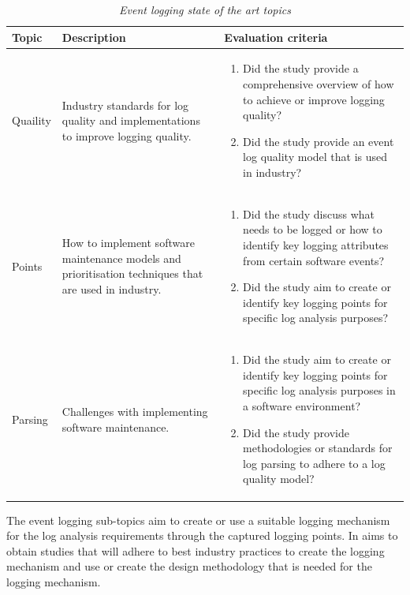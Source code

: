 \begin{table}[!htb]
	\centering
	\caption[Event logging state of the art topics]
	{\textit{Event logging state of the art topics}}
	\label{tbl:ch1_soaEventLogging}
	\begin{tabularx}{\linewidth}{|l|X|X|}
		\hline \textbf{Topic}  & \textbf{Description} & \textbf{Evaluation criteria}\\
		\hline Quaility & \RaggedRight Industry standards for log quality and implementations to improve logging quality.& \RaggedRight \begin{enumerate}
			\item Did the study provide a comprehensive overview of how to achieve or improve logging quality?
			\item Did the study provide an event log quality model that is used in industry?
		\end{enumerate} \\
		\hline Points & \RaggedRight How to implement software maintenance models and prioritisation techniques that are used in industry. & \RaggedRight \begin{enumerate}
			\item Did the study discuss what needs to be logged or how to identify key logging attributes from certain software events?
			\item Did the study aim to create or identify key logging points for specific log analysis purposes?
		\end{enumerate} \\
		\hline Parsing & \RaggedRight Challenges with implementing software maintenance. & \RaggedRight \begin{enumerate}
			\item Did the study aim to create or identify key logging points for specific log analysis purposes in a software environment?
			\item Did the study provide methodologies or standards for log parsing to adhere to a log quality model?
		\end{enumerate}\\	
		\hline
	\end{tabularx}
\end{table}

The event logging sub-topics aim to create or use a suitable logging mechanism for the log analysis requirements through the captured logging points. In  aims to obtain studies that will adhere to best industry practices to create the logging mechanism and use or create the design methodology that is needed for the logging mechanism.

